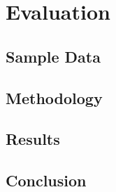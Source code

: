 \section{Evaluation}

\subsection{Sample Data}

\subsection{Methodology}

\subsection{Results}

\subsection{Conclusion}